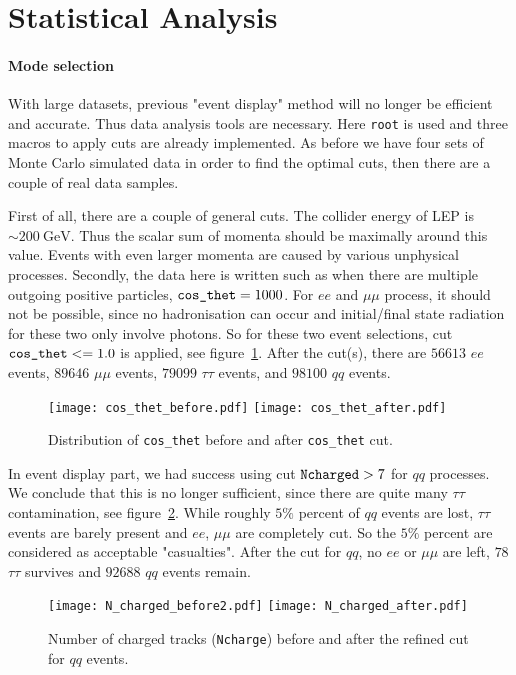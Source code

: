\clearpage
\section{Statistical Analysis}
\paragraph{Mode selection}
With large datasets, previous "event display" method will no longer be efficient and accurate. Thus data analysis tools are necessary. Here \verb|root| is used and three macros to apply cuts are already implemented. As before we have four sets of Monte Carlo simulated data in order to find the optimal cuts, then there are a couple of real data samples.

First of all, there are a couple of general cuts. The collider energy of LEP is $\sim\SI{200}{\giga\eV}$. Thus the scalar sum of momenta should be maximally around this value. Events with even larger momenta are caused by various unphysical processes. Secondly, the data here is written such as when there are multiple outgoing positive particles, $\verb|cos_thet|=1000$. For $ee$ and $\mu\mu$ process, it should not be possible, since no hadronisation can occur and initial/final state radiation for these two only involve photons. So for these two event selections, cut $\verb|cos_thet| <= 1.0$ is applied, see figure~\ref{fig:cos_thet_cut}. After the cut(s), there are $56613$ $ee$ events, $89646$ $\mu\mu$ events, $79099$ $\tau\tau$ events, and $98100$ $qq$ events.
\begin{figure}[ht]
	\centering
	\texttt{[image: cos\_thet\_before.pdf]}
	\texttt{[image: cos\_thet\_after.pdf]}
	\cprotect\caption{Distribution of \verb|cos_thet| before and after \verb|cos_thet| cut.}%
	\label{fig:cos_thet_cut}
\end{figure}

\clearpage
In event display part, we had success using cut $\verb|Ncharged| > 7$ for $qq$ processes. We conclude that this is no longer sufficient, since there are quite many $\tau\tau$ contamination, see figure~\ref{fig:qq_Ncharged_cuts}. While roughly $5\%$ percent of $qq$ events are lost, $\tau\tau$ events are barely present and $ee$, $\mu\mu$ are completely cut. So the $5\%$ percent are considered as acceptable "casualties". After the cut for $qq$, no $ee$ or $\mu\mu$ are left, $78$ $\tau\tau$ survives and $92688$ $qq$ events remain.
\begin{figure}[ht]
	\centering
	\texttt{[image: N\_charged\_before2.pdf]}
	\texttt{[image: N\_charged\_after.pdf]}
	\cprotect\caption{Number of charged tracks (\verb|Ncharge|) before and after the refined cut for $qq$ events.}%
	\label{fig:qq_Ncharged_cuts}
\end{figure}

